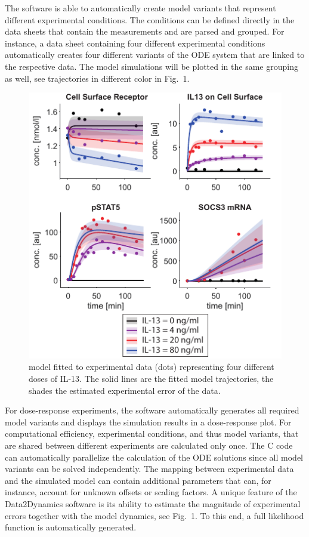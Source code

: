 \documentclass{bioinfo}
\begin{document}
The software is able to automatically create model variants that 
represent different experimental conditions. The conditions can be defined directly in 
the data sheets that contain the measurements and are parsed and 
grouped. For instance, a data sheet containing four 
different experimental conditions automatically creates four different 
variants of the ODE system that are linked to the 
respective data. The model simulations will be plotted in the same grouping as well, see 
trajectories in different color in Fig.~1. 
\begin{figure}[!tpb]
\centerline{\includegraphics[width=\linewidth]{Figure_D2D_AppNote_v4.pdf}}
\caption{\citet{Raia:2011vn} model fitted to experimental data (dots) representing four 
different doses of IL-13. The solid lines are the fitted model trajectories, the shades 
the estimated experimental error of the data.}\label{fig:01}
\end{figure}
For dose-response experiments, the software automatically generates all required 
model variants and displays the simulation results in a dose-response plot. For 
computational efficiency, experimental conditions, and thus model variants, that are 
shared between different experiments are calculated only once. The C code can 
automatically parallelize the calculation of the ODE solutions since all model variants can be solved independently. The mapping between experimental data 
and the simulated model can contain additional parameters that can, 
for instance, account for 
unknown offsets or scaling factors. A unique feature of the Data2Dynamics software is its 
ability to estimate the magnitude of experimental errors together with the model 
dynamics, see Fig.~1. To this end, a full likelihood function is automatically generated.
\end{document}
